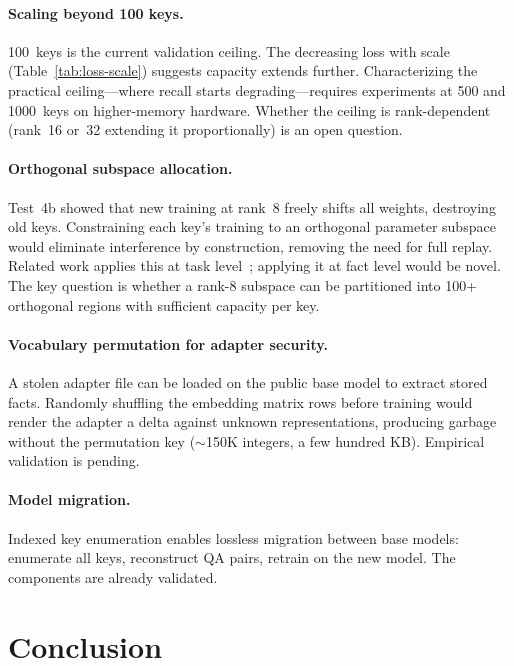 \documentclass[11pt]{article}
\begin{document}
\paragraph{Scaling beyond 100 keys.}
100~keys is the current validation ceiling.
The decreasing loss with scale (Table~\ref{tab:loss-scale}) suggests capacity extends further.
Characterizing the practical ceiling---where recall starts degrading---requires experiments at 500 and 1000~keys on higher-memory hardware.
Whether the ceiling is rank-dependent (rank~16 or~32 extending it proportionally) is an open question.

\paragraph{Orthogonal subspace allocation.}
Test~4b showed that new training at rank~8 freely shifts all weights, destroying old keys.
Constraining each key's training to an orthogonal parameter subspace would eliminate interference by construction, removing the need for full replay.
Related work applies this at task level~\citep{wang2023olora, liang2024inflora}; applying it at fact level would be novel.
The key question is whether a rank-8 subspace can be partitioned into 100+ orthogonal regions with sufficient capacity per key.

\paragraph{Vocabulary permutation for adapter security.}
A stolen adapter file can be loaded on the public base model to extract stored facts.
Randomly shuffling the embedding matrix rows before training would render the adapter a delta against unknown representations, producing garbage without the permutation key ($\sim$150K integers, a few hundred KB).
Empirical validation is pending.

\paragraph{Model migration.}
Indexed key enumeration enables lossless migration between base models: enumerate all keys, reconstruct QA pairs, retrain on the new model.
The components are already validated.

\section{Conclusion}
\label{sec:conclusion}
\end{document}

